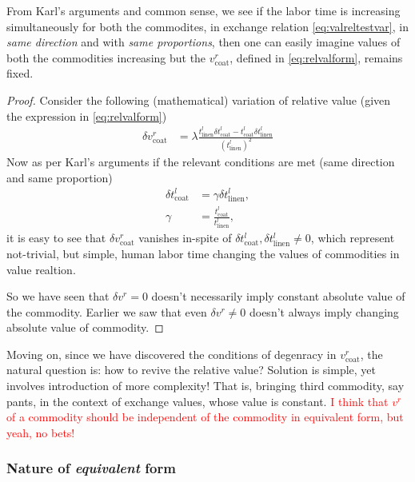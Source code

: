 \documentclass[12pt]{extarticle}
\theoremstyle{definition}
\begin{document}
 From Karl's arguments and common sense, we see if the labor time is increasing simultaneously for both the commodites, in exchange relation \ref{eq:valreltestvar}, in \emph{same direction} and with \emph{same proportions}, then one can easily imagine values of both the commodities increasing but the $v_{\text{coat}}^{r}$, defined in \ref{eq:relvalform}, remains fixed.

 \begin{proof}
   Consider the following (mathematical) variation of relative value (given the expression in \ref{eq:relvalform})
   \begin{align}
     \label{eq:variationdemo}
      \delta v_{\text{coat}}^{r} &= \lambda\frac{t_{\text{linen}}^l\delta{t_{\text{coat}}^l} - t_{\text{coat}}^l\delta{t_{\text{linen}}^l}}{\left(t_{\text{linen}}^l\right)^2}
   \end{align}
   Now as per Karl's arguments if the relevant conditions are met (same direction and same proportion)
   \begin{align}
     \delta{t_{\text{coat}}^l} &= \gamma \delta{t_{\text{linen}}^l},\\
     \gamma &= \frac{t_{\text{coat}}^l}{t_{\text{linen}}^l},
   \end{align}
   it is easy to see that $\delta v_{\text{coat}}^{r}$ vanishes in-spite of $ \delta{t_{\text{coat}}^l}, \delta{t_{\text{linen}}^l} \neq 0$, which represent not-trivial, but simple, human labor time changing the values of commodities in value realtion.

   So we have seen that $\delta v^r = 0$ doesn't necessarily imply constant absolute value of the commodity.  Earlier we saw that even $\delta v^r \neq 0$ doesn't always imply changing absolute value of commodity.
 \end{proof}

 Moving on, since we have discovered the conditions of degenracy in $v_{\text{coat}}^r$, the natural question is: how to revive the relative value?
 Solution is simple, yet involves introduction of more complexity!  That is, bringing third commodity, say pants, in the context of exchange values, whose value is constant.  \textcolor{red}{I think that $v^r$ of a commodity should be independent of the commodity in equivalent form, but yeah, no bets!}


\subsubsection{Nature of \emph{equivalent} form}




\end{document}
